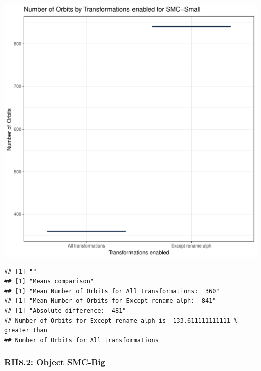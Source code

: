 \documentclass{article}\usepackage[]{graphicx}\usepackage[]{color}
\makeatletter
\def\maxwidth{ %
  \ifdim\Gin@nat@width>\linewidth
    \linewidth
  \else
    \Gin@nat@width
  \fi
}
\newenvironment{kframe}{%
 \def\at@end@of@kframe{}%
 \ifinner\ifhmode%
  \def\at@end@of@kframe{\end{minipage}}%
  \begin{minipage}{\columnwidth}%
 \fi\fi%
 \def\FrameCommand##1{\hskip\@totalleftmargin \hskip-\fboxsep
 \colorbox{shadecolor}{##1}\hskip-\fboxsep
     \hskip-\linewidth \hskip-\@totalleftmargin \hskip\columnwidth}%
 \MakeFramed {\advance\hsize-\width
   \@totalleftmargin\z@ \linewidth\hsize
   \@setminipage}}%
 {\par\unskip\endMakeFramed%
 \at@end@of@kframe}
\newenvironment{knitrout}{}{} %
\makeatother
\begin{document}
\begin{knitrout}
\color{fgcolor}
\includegraphics[width=\maxwidth]{figure/RH8_small-1} 
\begin{kframe}

{\ttfamily\noindent\bfseries\color{errorcolor}{\#\# Error in eval(expr, envir, enclos): object 'shap\_cashew\_small' not found}}\begin{verbatim}
## [1] ""
## [1] "Means comparison"
## [1] "Mean Number of Orbits for All transformations:  360"
## [1] "Mean Number of Orbits for Except rename alph:  841"
## [1] "Absolute difference:  481"
## Number of Orbits for Except rename alph is  133.611111111111 % greater than 
## Number of Orbits for All transformations
\end{verbatim}
\end{kframe}
\end{knitrout}


\subsubsection{RH8.2: Object SMC-Big}
\end{document}

